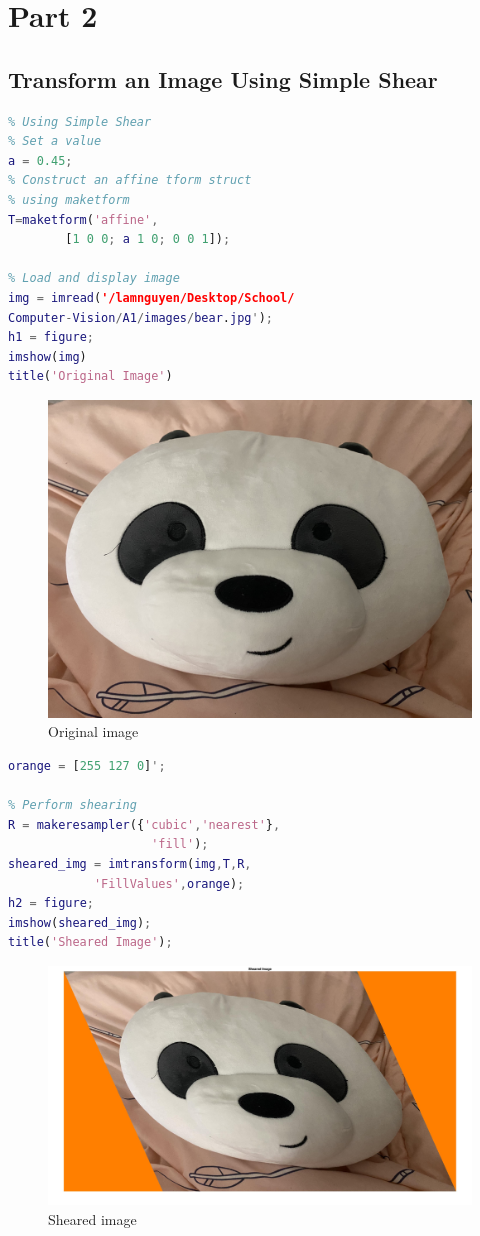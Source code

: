 \documentclass[conference]{IEEEtran}
\begin{document}
\clearpage
\section{Part 2}

\subsection{Transform an Image Using Simple Shear}
\begin{lstlisting}[language=Matlab]
% Step 1: Transform an Image 
% Using Simple Shear
% Set a value
a = 0.45;
% Construct an affine tform struct 
% using maketform
T=maketform('affine',
        [1 0 0; a 1 0; 0 0 1]);

% Load and display image
img = imread('/lamnguyen/Desktop/School/
Computer-Vision/A1/images/bear.jpg');
h1 = figure;
imshow(img)
title('Original Image')
\end{lstlisting}

\begin{figure}[h!]
\centering
\includegraphics[width=0.8\linewidth]{images/bear.jpg}
\caption{Original image}
\label{fig:bear}
\end{figure}

\begin{lstlisting}[language=Matlab]
% Choose a shade of orange as fill value
orange = [255 127 0]';

% Perform shearing
R = makeresampler({'cubic','nearest'},
                    'fill');
sheared_img = imtransform(img,T,R,
            'FillValues',orange);
h2 = figure; 
imshow(sheared_img);
title('Sheared Image');
\end{lstlisting}

\begin{figure}[h!]
\centering
\includegraphics[width=0.8\linewidth]{images/img26.jpg}
\caption{Sheared image}
\label{fig:sheared}
\end{figure}
\end{document}
